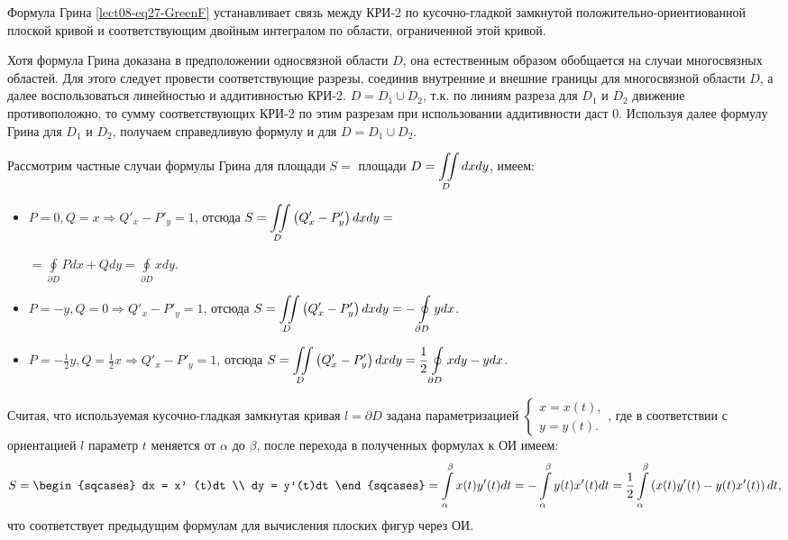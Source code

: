 \begin{notes}
	\item Формула Грина \eqref{lect08-eq27-GreenF} устанавливает связь между КРИ-2 по кусочно-гладкой замкнутой положительно-ориентиованной плоской кривой и соответствующим двойным интегралом по области, ограниченной этой кривой.
	\item Хотя формула Грина доказана в предположении односвязной области $D$, она естественным образом обобщается на случаи многосвязных областей. Для этого следует провести соответствующие разрезы, соединив внутренние и внешние границы для многосвязной области $D$, а далее воспользоваться линейностью и аддитивностью КРИ-2. $D = D_1 \cup D_2$, т.к. по линиям разреза для $D_1$ и $D_2$ движение противоположно, то сумму соответствующих КРИ-2 по этим разрезам при использовании аддитивности даст $0$. Используя далее формулу Грина для $D_1$ и $D_2$, получаем справедливую формулу и для $D = D_1 \cup D_2$.
	\item Рассмотрим частные случаи формулы Грина для площади $S = $ площади $D = \displaystyle\iint\limits_D dxdy$, имеем:
	\begin{itemize}
		\item $P = 0, Q = x \Rightarrow Q'_x - P'_y = 1$, отсюда $S = \displaystyle\iint\limits_D \left( Q'_x - P'_y \right) dx dy = $ 
		
		$= \oint\limits_{\partial D} Pdx + Qdy = \oint\limits_{\partial D} xdy$.
		\item $P = -y, Q = 0 \Rightarrow Q'_x - P'_y = 1$, отсюда $S = \displaystyle\iint\limits_D \left( Q'_x - P'_y \right) dx dy = - \oint\limits_{\partial D} ydx$.
		\item $P = -\frac{1}{2} y, Q = \frac{1}{2} x \Rightarrow Q'_x - P'_y = 1$, отсюда $S = \displaystyle\iint\limits_D \left( Q'_x - P'_y \right) dx dy = \frac{1}{2}  \oint\limits_{\partial D} xdy - ydx$.
	\end{itemize}
\end{notes}

Считая, что используемая кусочно-гладкая замкнутая кривая $l = \partial D$ задана параметризацией $\begin{cases}
x = x(t), \\ y = y(t).\end{cases}$, где в соответствии с ориентацией $l$ параметр $t$ меняется  от $\alpha$ до $\beta$, после перехода в полученных формулах к ОИ имеем:
\begin{equation*}
	S = \begin{sqcases} dx = x' (t)dt \\ dy = y'(t)dt \end{sqcases} = \dint\limits_\alpha^\beta x(t)y'(t)dt = -\dint\limits_\alpha^\beta y(t)x'(t)dt = \frac{1}{2} \dint\limits_\alpha^\beta \left(x(t)y'(t) - y(t) x'(t) \right)dt,
\end{equation*}
что соответствует предыдущим формулам для вычисления плоских фигур через ОИ.

